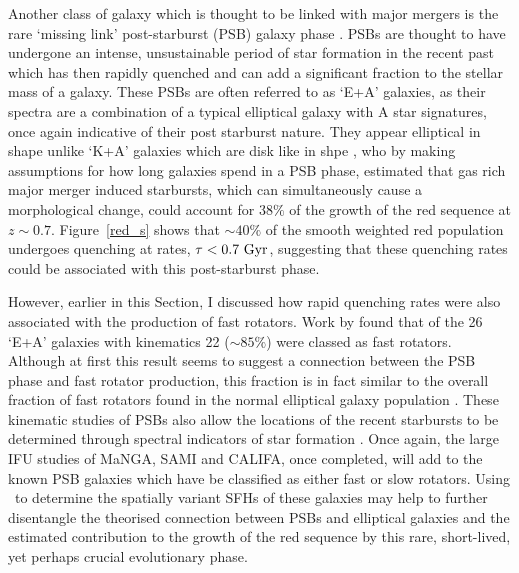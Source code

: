 Another class of galaxy which is thought to be linked with major mergers is the rare \citep[$<1\%$;][]{Wong12, wild16} `missing link' post-starburst (PSB) galaxy phase \citep{zabludoff96, blake04, goto05b, yang08, pawlik16}. PSBs are thought to have undergone an intense, unsustainable period of star formation in the recent past which has then rapidly quenched \citep{dressler83, abraham96b, poggianti99, goto03, goto05b, goto07} and can add a significant fraction \citep[$\sim10\%$;][]{wild10} to the stellar mass of a galaxy. These PSBs are often referred to as `E+A' galaxies, as their spectra are a combination of a typical elliptical galaxy with A star signatures, once again indicative of their post starburst nature. They appear elliptical in shape unlike `K+A' galaxies which are disk like in shpe  \citet{Wild09}, who by making assumptions for how long galaxies spend in a PSB phase, estimated that gas rich major merger induced starbursts, which can simultaneously cause a morphological change, could account for $38\%$ of the growth of the red sequence at $z\sim0.7$. Figure~\ref{red_s} shows that $\sim40\%$ of the smooth weighted red population undergoes quenching at rates, $\tau < 0.7~\rm{Gyr}$, suggesting that these quenching rates could be associated with this post-starburst phase. 

However, earlier in this Section, I discussed how rapid quenching rates were also associated with the production of fast rotators. Work by \cite{pracy13} found that of the 26 `E+A' galaxies with kinematics 22 ($\sim85\%$) were classed as fast rotators. Although at first this result seems to suggest a connection between the PSB phase and fast rotator production, this fraction is in fact similar to the overall fraction of fast rotators found in the normal elliptical galaxy population \citep{emsellem11, stott16}. These kinematic studies of PSBs also allow the locations of the recent starbursts to be determined through spectral indicators of star formation \citep[such as $H\alpha$;][]{kennicutt94}. Once again, the large IFU studies of MaNGA, SAMI and CALIFA, once completed, will add to the known PSB galaxies which have be classified as either fast or slow rotators. Using \starpy\ to determine the spatially variant SFHs of these galaxies may help to further disentangle the theorised connection between PSBs and elliptical galaxies and the estimated contribution to the growth of the red sequence by this rare, short-lived, yet perhaps crucial evolutionary phase. 

